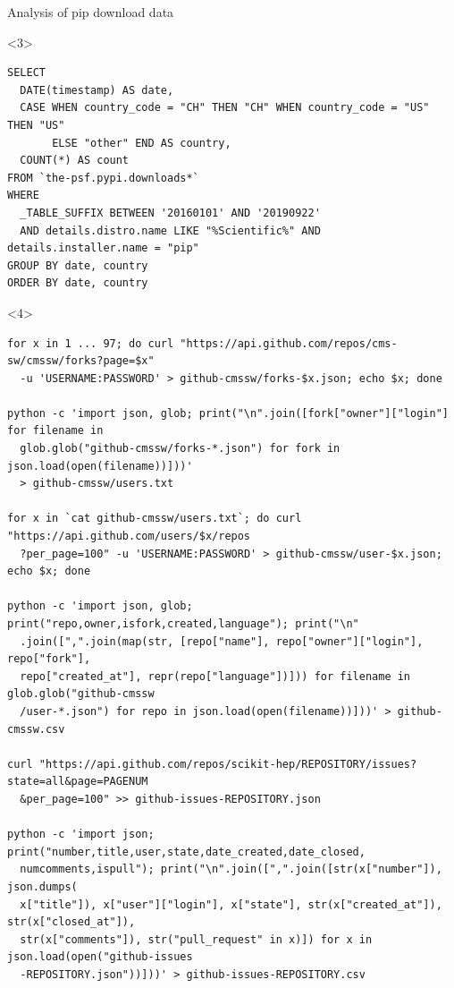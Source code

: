 \documentclass[aspectratio=169]{beamer}
\begin{document}
\begin{frame}[fragile]{Analysis of pip download data }
\begin{onlyenv}
\vspace{10 cm}
\end{onlyenv}\begin{onlyenv}<3>
\begin{verbatim}
SELECT
  DATE(timestamp) AS date,
  CASE WHEN country_code = "CH" THEN "CH" WHEN country_code = "US" THEN "US"
       ELSE "other" END AS country,
  COUNT(*) AS count
FROM `the-psf.pypi.downloads*`
WHERE
  _TABLE_SUFFIX BETWEEN '20160101' AND '20190922'
  AND details.distro.name LIKE "%Scientific%" AND details.installer.name = "pip"
GROUP BY date, country
ORDER BY date, country
\end{verbatim}
\vspace{10 cm}
\end{onlyenv}\begin{onlyenv}<4>
\begin{verbatim}
for x in 1 ... 97; do curl "https://api.github.com/repos/cms-sw/cmssw/forks?page=$x"
  -u 'USERNAME:PASSWORD' > github-cmssw/forks-$x.json; echo $x; done

python -c 'import json, glob; print("\n".join([fork["owner"]["login"] for filename in
  glob.glob("github-cmssw/forks-*.json") for fork in json.load(open(filename))]))'
  > github-cmssw/users.txt

for x in `cat github-cmssw/users.txt`; do curl "https://api.github.com/users/$x/repos
  ?per_page=100" -u 'USERNAME:PASSWORD' > github-cmssw/user-$x.json; echo $x; done

python -c 'import json, glob; print("repo,owner,isfork,created,language"); print("\n"
  .join([",".join(map(str, [repo["name"], repo["owner"]["login"], repo["fork"],
  repo["created_at"], repr(repo["language"])])) for filename in glob.glob("github-cmssw
  /user-*.json") for repo in json.load(open(filename))]))' > github-cmssw.csv

curl "https://api.github.com/repos/scikit-hep/REPOSITORY/issues?state=all&page=PAGENUM
  &per_page=100" >> github-issues-REPOSITORY.json

python -c 'import json; print("number,title,user,state,date_created,date_closed,
  numcomments,ispull"); print("\n".join([",".join([str(x["number"]), json.dumps(
  x["title"]), x["user"]["login"], x["state"], str(x["created_at"]), str(x["closed_at"]),
  str(x["comments"]), str("pull_request" in x)]) for x in json.load(open("github-issues
  -REPOSITORY.json"))]))' > github-issues-REPOSITORY.csv 
\end{verbatim}
\vspace{10 cm}
\end{onlyenv}
\end{frame}
\end{document}
